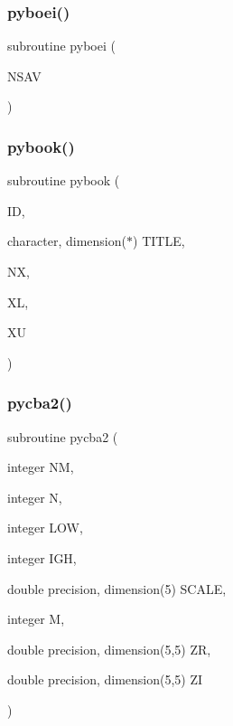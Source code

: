 \subsubsection{\texorpdfstring{pyboei()}{pyboei()}}
{\footnotesize\ttfamily subroutine pyboei (\begin{DoxyParamCaption}\item[{}]{N\+S\+AV }\end{DoxyParamCaption})}

\mbox{\label{pythia-6_84_824_8f_a06a98b7423ece43b210d6e86912b5cc9}} 
\subsubsection{\texorpdfstring{pybook()}{pybook()}}
{\footnotesize\ttfamily subroutine pybook (\begin{DoxyParamCaption}\item[{}]{ID,  }\item[{character, dimension($\ast$)}]{T\+I\+T\+LE,  }\item[{}]{NX,  }\item[{}]{XL,  }\item[{}]{XU }\end{DoxyParamCaption})}

\mbox{\label{pythia-6_84_824_8f_a4bf2dad3f00ccb67ad7770282f83c36e}} 
\subsubsection{\texorpdfstring{pycba2()}{pycba2()}}
{\footnotesize\ttfamily subroutine pycba2 (\begin{DoxyParamCaption}\item[{integer}]{NM,  }\item[{integer}]{N,  }\item[{integer}]{L\+OW,  }\item[{integer}]{I\+GH,  }\item[{double precision, dimension(5)}]{S\+C\+A\+LE,  }\item[{integer}]{M,  }\item[{double precision, dimension(5,5)}]{ZR,  }\item[{double precision, dimension(5,5)}]{ZI }\end{DoxyParamCaption})}

